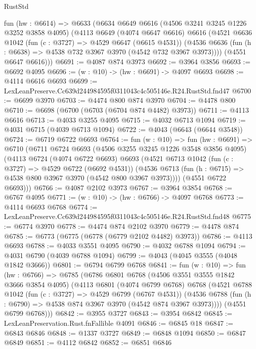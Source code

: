 \begin{lexlean}{RustStd}
\begin{coremodule}
  fun (hw : @6614) =>
  @6633
    (@6634
      @6649
      @6616
      (@4506 @3241 @3245 @1226 @3252 @3858 @4095)
      (@4113
        @6649
        (@4074 @6647 @6616)
        @6616
        (@4521
          @6636
          @1042
          (fun (c : @3727) => @4529 @6647 (@6615 @4531))
          (@4536 @6636 (fun (h : @6638) => @4538 @732 @3967 @3970 (@4542 @732 @3967 @3973))))
        (@4551 @6647 @6616)))
@6691 := @4087 @874 @3973
@6692 := @3964 @3856
@6693 := @6692 @4095
@6696 := (w : @10) -> (hw : @6691) -> @4097 @6693
@6698 := @4114 @6616 @6693
@6699 := LexLeanPreserve.Cc639d244984595f0311043c4c505146e.R24.RustStd.fnd47
@6700 := @6699 @3970
@6703 := @4474 @800 @874 @3970
@6704 := @4478 @800
@6710 := @6698 (@6700 (@6703 (@6704 @874 @4482) @3973))
@6711 := @4113 @6616
@6713 := @4033 @3255 @4095
@6715 := @4032 @6713 @1094
@6719 := @4031 @6715 (@4039 @6713 @1094)
@6722 := @4043 (@6643 (@6644 @3548))
@6724 := @6719 @6722 @6693
@6764 := fun (w : @10) =>
  fun (hw : @6691) =>
  @6710
    (@6711
      @6724
      @6693
      (@4506 @3255 @3245 @1226 @3548 @3856 @4095)
      (@4113
        @6724
        (@4074 @6722 @6693)
        @6693
        (@4521
          @6713
          @1042
          (fun (c : @3727) => @4529 @6722 (@6692 @4531))
          (@4536 @6713 (fun (h : @6715) => @4538 @800 @3967 @3970 (@4542 @800 @3967 @3973))))
        (@4551 @6722 @6693)))
@6766 := @4087 @2102 @3973
@6767 := @3964 @3854
@6768 := @6767 @4095
@6771 := (w : @10) -> (hw : @6766) -> @4097 @6768
@6773 := @4114 @6693 @6768
@6774 := LexLeanPreserve.Cc639d244984595f0311043c4c505146e.R24.RustStd.fnd48
@6775 := @6774 @3970
@6778 := @4474 @874 @2102 @3970
@6779 := @4478 @874
@6785 := @6773 (@6775 (@6778 (@6779 @2102 @4482) @3973))
@6786 := @4113 @6693
@6788 := @4033 @3551 @4095
@6790 := @4032 @6788 @1094
@6794 := @4031 @6790 (@4039 @6788 @1094)
@6799 := @4043 (@4045 @3555 (@4048 @1842 @3666))
@6801 := @6794 @6799 @6768
@6841 := fun (w : @10) =>
  fun (hw : @6766) =>
  @6785
    (@6786
      @6801
      @6768
      (@4506 @3551 @3555 @1842 @3666 @3854 @4095)
      (@4113
        @6801
        (@4074 @6799 @6768)
        @6768
        (@4521
          @6788
          @1042
          (fun (c : @3727) => @4529 @6799 (@6767 @4531))
          (@4536 @6788 (fun (h : @6790) => @4538 @874 @3967 @3970 (@4542 @874 @3967 @3973))))
        (@4551 @6799 @6768)))
@6842 := @3955 @3727
@6843 := @3954 @6842
@6845 := LexLeanPreservation.Rust.fnFallible @4091
@6846 := @6845 @18
@6847 := @6843 @6846
@6848 := @1337 @3727
@6849 := @6848 @1094
@6850 := @6847 @6849
@6851 := @4112 @6842
@6852 := @6851 @6846

\end{coremodule}
\end{lexlean}
